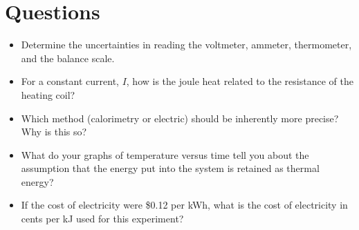 
\section{Questions}
\begin{itemize}
	\item Determine the uncertainties in reading the voltmeter, ammeter, thermometer, and the balance scale.
	\item For a constant current, $I$, how is the joule heat related to the resistance of the heating coil?
	\item Which method (calorimetry or electric) should be inherently more precise?  Why is this so?
	\item What do your graphs of temperature versus time tell you about the assumption that the energy put into the system is retained as thermal energy?
	\item If the cost of electricity were \$0.12 per kWh, what is the cost of electricity in cents per kJ used for this experiment?
\end{itemize}

\endinput
